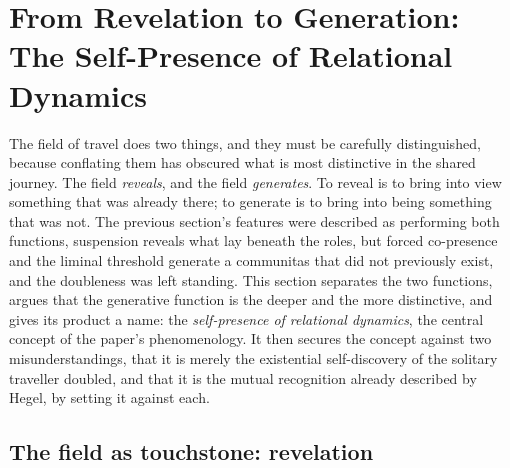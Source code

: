 \section{From Revelation to Generation: The Self-Presence of Relational Dynamics}
\label{p21:sec:selfpresence}

\noindent
The field of travel does two things, and they must be carefully distinguished, because conflating them has obscured what is most distinctive in the shared journey. The field \emph{reveals}, and the field \emph{generates}. To reveal is to bring into view something that was already there; to generate is to bring into being something that was not. The previous section's features were described as performing both functions, suspension reveals what lay beneath the roles, but forced co-presence and the liminal threshold generate a communitas that did not previously exist, and the doubleness was left standing. This section separates the two functions, argues that the generative function is the deeper and the more distinctive, and gives its product a name: the \emph{self-presence of relational dynamics}, the central concept of the paper's phenomenology. It then secures the concept against two misunderstandings, that it is merely the existential self-discovery of the solitary traveller doubled, and that it is the mutual recognition already described by Hegel, by setting it against each.

\subsection{The field as touchstone: revelation}
\label{p21:sub:sp-revelation}

